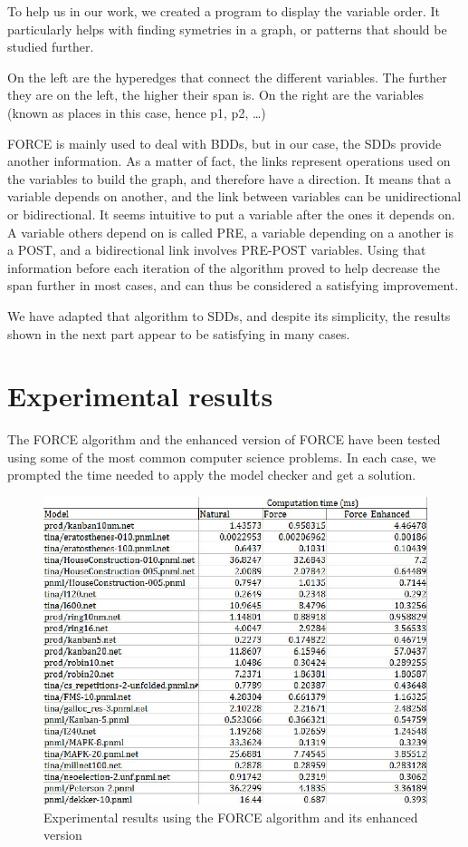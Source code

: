 \documentclass[12pt]{report}
\begin{document}
To help us in our work, we created a program to display the variable order. It particularly helps with finding symetries in a graph, or patterns that should be studied further.

On the left are the hyperedges that connect the different variables. The further they are on the left, the higher their span is. On the right are the variables (known as places in this case, hence p1, p2, \ldots)

FORCE is mainly used to deal with BDDs, but in our case, the SDDs provide another information. As a matter of fact, the links represent operations used on the variables to build the graph, and therefore have a direction. It means that a variable depends on another, and the link between variables can be unidirectional or bidirectional. It seems intuitive to put a variable after the ones it depends on. A variable others depend on is called PRE, a variable depending on a another is a POST, and a bidirectional link involves PRE-POST variables. Using that information before each iteration of the algorithm proved to help decrease the span further in most cases, and can thus be considered a satisfying improvement.

We have adapted that algorithm to SDDs, and despite its simplicity, the results shown in the next part appear to be satisfying in many cases.

\chapter{Experimental results}

The FORCE algorithm and the enhanced version of FORCE have been tested using some of the most common computer science problems. In each case, we prompted the time needed to apply the model checker and get a solution.

\begin{figure}[!h]
  \includegraphics[scale=0.35]{force_results.jpg}
  \caption{Experimental results using the FORCE algorithm and its enhanced version}
  \label{force_results}
\end{figure}
\end{document}

